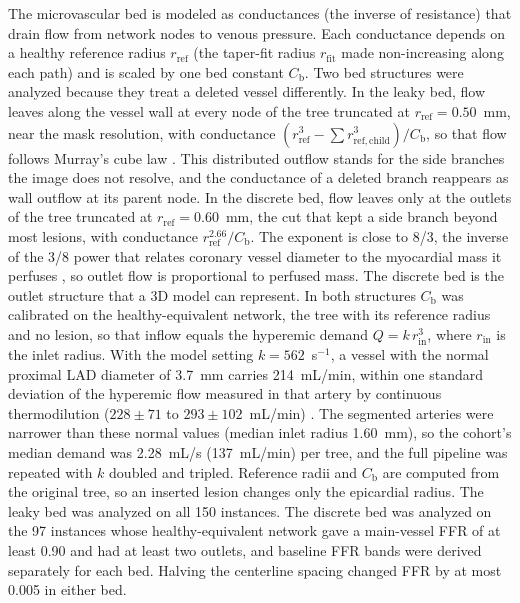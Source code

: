 \documentclass[journal,twoside,web]{ieeecolor}
\begin{document}
The microvascular bed is modeled as conductances (the inverse of resistance) that drain flow from network nodes to
venous pressure. Each conductance depends on a healthy reference radius $r_\mathrm{ref}$ (the taper-fit radius
$r_\mathrm{fit}$ made non-increasing along each path) and is scaled by one bed constant $C_\mathrm{b}$. Two bed structures were analyzed because they treat a deleted vessel differently. In the leaky
bed, flow leaves along the vessel wall at every node of the tree truncated at $r_\mathrm{ref} = 0.50$~mm, near the mask resolution, with
conductance $(r_\mathrm{ref}^3 - \sum r_{\mathrm{ref},\mathrm{child}}^3)/C_\mathrm{b}$, so that flow follows Murray's cube law
\cite{murray1926}. This distributed outflow stands for the side branches the image does not resolve, and the
conductance of a deleted branch reappears as wall outflow at its parent node. In the discrete bed, flow leaves only
at the outlets of the tree truncated at $r_\mathrm{ref} = 0.60$~mm, the cut that kept a side branch beyond most lesions, with conductance $r_\mathrm{ref}^{2.66}/C_\mathrm{b}$.
The exponent is close to 8/3, the inverse of the 3/8 power that relates coronary vessel diameter to the
myocardial mass it perfuses \cite{choy2008}, so outlet flow is proportional to perfused mass. The discrete bed is the outlet structure that a 3D model can
represent. In both structures $C_\mathrm{b}$ was calibrated on the healthy-equivalent network, the tree with its reference
radius and no lesion, so that inflow equals the hyperemic demand $Q = k\,r_\mathrm{in}^3$, where $r_\mathrm{in}$ is
the inlet radius. With the model setting $k = 562$~s$^{-1}$, a
vessel with the normal proximal LAD diameter of 3.7~mm \cite{dodge1992} carries 214~mL/min,
within one standard deviation of the hyperemic flow measured in that artery by continuous thermodilution
($228 \pm 71$ to $293 \pm 102$~mL/min) \cite{fournier2021}. The segmented arteries were narrower than these
normal values (median inlet radius 1.60~mm), so the cohort's median demand was 2.28~mL/s (137~mL/min) per tree, and
the full pipeline was repeated with $k$ doubled and tripled. Reference radii and $C_\mathrm{b}$ are computed from the original tree, so an inserted lesion changes
only the epicardial radius. The leaky bed was analyzed on all 150 instances. The discrete bed was analyzed on the
97 instances whose healthy-equivalent network gave a main-vessel FFR of at least 0.90 and had at least two outlets,
and baseline FFR bands were derived separately for each bed. Halving the centerline spacing changed FFR by at most
0.005 in either bed.
\end{document}

